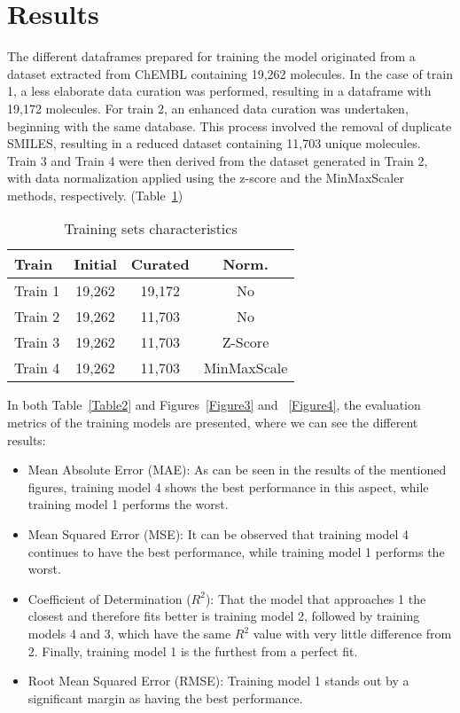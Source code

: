 \documentclass[final,times,twocolumn,article]{elsarticle}
\begin{document}
\section{Results}

The different dataframes prepared for training the model originated from a dataset extracted from ChEMBL containing 19,262 molecules. In the case of train 1, a less elaborate data curation was performed, resulting in a dataframe with 19,172 molecules. For train 2, an enhanced data curation was undertaken, beginning with the same database. This process involved the removal of duplicate SMILES, resulting in a reduced dataset containing 11,703 unique molecules. Train 3 and Train 4 were then derived from the dataset generated in Train 2, with data normalization applied using the z-score and the MinMaxScaler methods, respectively. (Table~\ref{Table1})

\begin{table}[ht]
\centering
\begin{tabular}{l c c c} 
     \hline
     Train & Initial & Curated & Norm.\\ 
     \hline
     Train 1 & 19,262 & 19,172 & No\\
     \hline
     Train 2 & 19,262 & 11,703 & No \\
     \hline
     Train 3 & 19,262 & 11,703 & Z-Score\\ 
     \hline
     Train 4 & 19,262 & 11,703 & MinMaxScale\\ 
     \hline
    \end{tabular}
\caption{Training sets characteristics}
\label{Table1}
\end{table}

In both Table~\ref{Table2} and Figures~\ref{Figure3} and ~\ref{Figure4}, the evaluation metrics of the training models are presented, where we can see the different results: 

\begin{itemize}
\item Mean Absolute Error (MAE): As can be seen in the results of the mentioned figures, training model 4 shows the best performance in this aspect, while training model 1 performs the worst.
\item Mean Squared Error (MSE): It can be observed that training model 4 continues to have the best performance, while training model 1 performs the worst.
\item Coefficient of Determination ($R^2$): That the model that approaches 1 the closest and therefore fits better is training model 2, followed by training models 4 and 3, which have the same $R^2$ value with very little difference from 2. Finally, training model 1 is the furthest from a perfect fit.
\item Root Mean Squared Error (RMSE): Training model 1 stands out by a significant margin as having the best performance.
\end{itemize}
\end{document}
